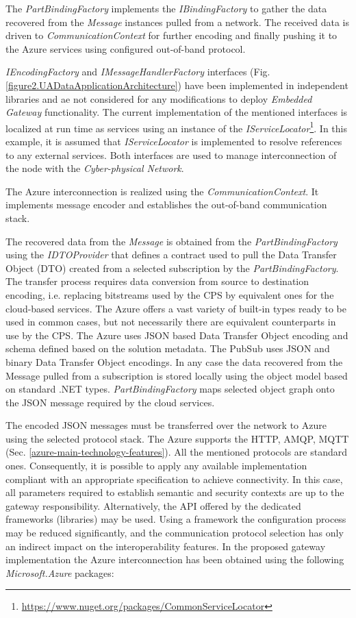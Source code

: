 \documentclass{jacsart}
\begin{document}
The \textit{PartBindingFactory} implements the \textit{IBindingFactory} to gather the data recovered from the \emph{Message} instances pulled from a network. The received data is driven to \textit{CommunicationContext} for further encoding and finally pushing it to the Azure services using configured out-of-band protocol.

\textit{IEncodingFactory} and \textit{IMessageHandlerFactory} interfaces (Fig. \ref*{figure2.UADataApplicationArchitecture}) have been implemented in independent libraries and ae not considered for any modifications to deploy \textit{Embedded Gateway} functionality. The current implementation of the mentioned interfaces is localized at run time as services using an instance of the \textit{IServiceLocator}\footnote{ \url{https://www.nuget.org/packages/CommonServiceLocator} }. In this example, it is assumed that \textit{IServiceLocator} is implemented to resolve references to any external services. Both interfaces are used to manage interconnection of the node with the \textit{Cyber-physical Network}.

The Azure interconnection is realized using the \textit{CommunicationContext}. It implements message encoder and establishes the out-of-band communication stack.

The recovered data from the \textit{Message} is obtained from the \textit{PartBindingFactory} using the \textit{IDTOProvider} that defines a contract used to pull the Data Transfer Object (DTO) created from a selected subscription by the \textit{PartBindingFactory}. The transfer process requires data conversion from source to destination encoding, i.e. replacing bitstreams used by the CPS by equivalent ones for the cloud-based services. The Azure offers a vast variety of built-in types ready to be used in common cases, but not necessarily there are equivalent counterparts in use by the CPS. The Azure uses JSON based Data Transfer Object encoding and schema defined based on the solution metadata. The PubSub uses JSON and binary Data Transfer Object encodings. In any case the data recovered from the Message pulled from a subscription is stored locally using the object model based on standard .NET types. \textit{PartBindingFactory} maps selected object graph onto the JSON message required by the cloud services.

The encoded JSON messages must be transferred over the network to Azure using the selected protocol stack. The Azure supports the HTTP, AMQP, MQTT (Sec. \ref*{azure-main-technology-features}). All the mentioned protocols are standard ones. Consequently, it is possible to apply any available implementation compliant with an appropriate specification to achieve connectivity. In this case, all parameters required to establish semantic and security contexts are up to the gateway responsibility. Alternatively, the API offered by the dedicated frameworks (libraries) may be used. Using a framework the configuration process may be reduced significantly, and the communication protocol selection has only an indirect impact on the interoperability features. In the proposed gateway implementation the Azure interconnection has been obtained using the following \textit{Microsoft.Azure} packages:
\end{document}

